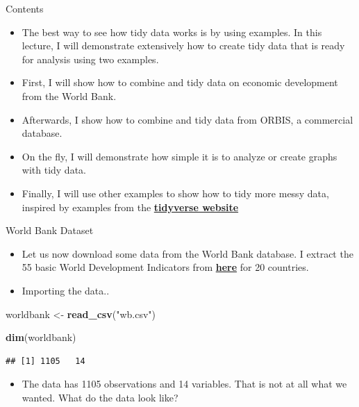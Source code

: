 \documentclass[10pt,ignorenonframetext,]{beamer}
\newenvironment{Shaded}{\begin{snugshade}}{\end{snugshade}}
\newcommand{\KeywordTok}[1]{\textcolor[rgb]{0.13,0.29,0.53}{\textbf{#1}}}
\newcommand{\NormalTok}[1]{#1}
\newcommand{\StringTok}[1]{\textcolor[rgb]{0.31,0.60,0.02}{#1}}
\providecommand{\tightlist}{%
  \setlength{\itemsep}{0pt}\setlength{\parskip}{0pt}}
\begin{document}
\begin{frame}{Contents}
\protect\hypertarget{contents}{}

\begin{itemize}
\item
  The best way to see how tidy data works is by using examples. In this
  lecture, I will demonstrate extensively how to create tidy data that
  is ready for analysis using two examples.
\item
  First, I will show how to combine and tidy data on economic
  development from the World Bank.
\item
  Afterwards, I show how to combine and tidy data from ORBIS, a
  commercial database.
\item
  On the fly, I will demonstrate how simple it is to analyze or create
  graphs with tidy data.
\item
  Finally, I will use other examples to show how to tidy more messy
  data, inspired by examples from the
  \href{https://tidyr.tidyverse.org/reference/pivot_longer.html}{\textbf{tidyverse
  website}}
\end{itemize}

\end{frame}

\begin{frame}[fragile]{World Bank Dataset}
\protect\hypertarget{world-bank-dataset}{}

\begin{itemize}
\item
  Let us now download some data from the World Bank database. I extract
  the 55 basic World Development Indicators from
  \href{https://databank.worldbank.org/source/world-development-indicators/}{\textbf{here}}
  for 20 countries.
\item
  Importing the data..
\end{itemize}

\begin{Shaded}
\begin{Highlighting}[]
\NormalTok{worldbank <-}\StringTok{ }\KeywordTok{read_csv}\NormalTok{(}\StringTok{"wb.csv"}\NormalTok{)}

\KeywordTok{dim}\NormalTok{(worldbank)}
\end{Highlighting}
\end{Shaded}

\begin{verbatim}
## [1] 1105   14
\end{verbatim}

\begin{itemize}
\tightlist
\item
  The data has 1105 observations and 14 variables. That is not at all
  what we wanted. What do the data look like?
\end{itemize}

\end{frame}
\end{document}
